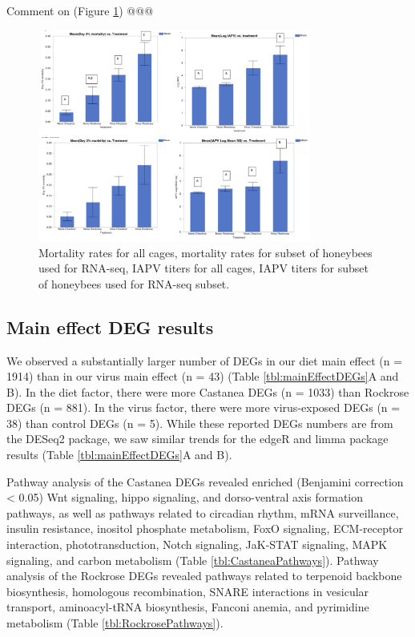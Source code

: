 \documentclass[11pt,a4paper,oldfontcommands,openany]{memoir}
\numberwithin{equation}{section} %
\begin{document}
Comment on (Figure \ref{fig:4panels}) @@@

\begin{figure}[H]
\centering
  \begin{framed}
  \includegraphics[width=0.8\textwidth]{Images/4panels}
  \end{framed}
  \caption{Mortality rates for all cages, mortality rates for subset of honeybees used for RNA-seq, IAPV titers for all cages, IAPV titers for subset of honeybees used for RNA-seq subset.}
  \label{fig:4panels}
\end{figure}

\subsection{Main effect DEG results}

We observed a substantially larger number of DEGs in our diet main effect (n = 1914) than in our virus main effect (n = 43) (Table \ref{tbl:mainEffectDEGs}A and B). In the diet factor, there were more Castanea DEGs (n = 1033) than Rockrose DEGs (n = 881). In the virus factor, there were more virus-exposed DEGs (n = 38) than control DEGs (n = 5). While these reported DEGs numbers are from the DESeq2 package, we saw similar trends for the edgeR and limma package results (Table \ref{tbl:mainEffectDEGs}A and B).

Pathway analysis of the Castanea DEGs revealed enriched (Benjamini correction < 0.05) Wnt signaling, hippo signaling, and dorso-ventral axis formation pathways, as well as pathways related to circadian rhythm, mRNA surveillance, insulin resistance, inositol phosphate metabolism, FoxO signaling, ECM-receptor interaction, phototransduction, Notch signaling, JaK-STAT signaling, MAPK signaling, and carbon metabolism (Table \ref{tbl:CastaneaPathways}). Pathway analysis of the Rockrose DEGs revealed pathways related to terpenoid backbone biosynthesis, homologous recombination, SNARE interactions in vesicular transport, aminoacyl-tRNA biosynthesis, Fanconi anemia, and pyrimidine metabolism (Table \ref{tbl:RockrosePathways}).
\end{document}
